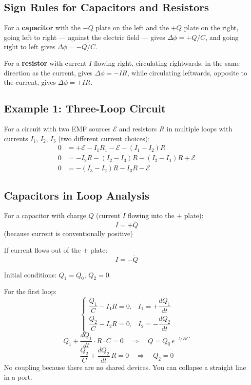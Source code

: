 \subsection{Sign Rules for Capacitors and Resistors}

For a \textbf{capacitor} with the $-Q$ plate on the left and the $+Q$ plate on the right, going left to right --- against the electric field --- gives $\Delta\phi = +Q/C$, and going right to left gives $\Delta\phi = -Q/C$.

For a \textbf{resistor} with current $I$ flowing right, circulating rightwards, in the same direction as the current, gives $\Delta\phi = -IR$, while circulating leftwards, opposite to the current, gives $\Delta\phi = +IR$.

\subsection{Example 1: Three-Loop Circuit}

For a circuit with two EMF sources $\mathcal{E}$ and resistors $R$ in multiple loops with currents $I_1$, $I_2$, $I_3$ (two different current choices):
\begin{align*}
    0 &= +\mathcal{E} - I_1 R_1 - \mathcal{E} - (I_1 - I_2)R \\
    0 &= -I_2 R - (I_2-I_3)R - (I_2-I_1)R + \mathcal{E} \\
    0 &= -(I_3-I_2)R - I_3 R - \mathcal{E}
\end{align*}

\subsection{Capacitors in Loop Analysis}

For a capacitor with charge $Q$ (current $I$ flowing into the $+$ plate):
\[
    I = +\dot{Q}
\]
(because current is conventionally positive)

If current flows out of the $+$ plate:
\[
    I = -\dot{Q}
\]

\begin{example}
Initial conditions: $Q_1 = Q_0$, $Q_2 = 0$.

For the first loop:
\[
    \begin{cases}
        \dfrac{Q_1}{C} - I_1 R = 0, & I_1 = +\dfrac{dQ_1}{dt} \\[6pt]
        \dfrac{Q_2}{C} - I_2 R = 0, & I_2 = -\dfrac{dQ_2}{dt}
    \end{cases}
\]
\[
    Q_1 + \frac{dQ_1}{dt}\cdot R \cdot C = 0 \quad\Rightarrow\quad Q = Q_0\,e^{-t/RC}
\]
\[
    \frac{Q_2}{C} + \frac{dQ_2}{dt}\,R = 0 \quad\Rightarrow\quad Q_2 = 0
\]
No coupling because there are no shared devices. You can collapse a straight line in a port.
\end{example}


